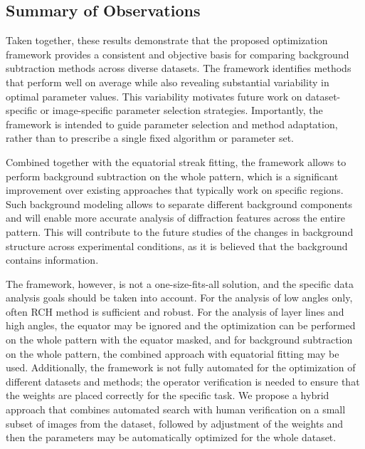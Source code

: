 \documentclass[iucr]{iucrjournals}
\begin{document}
\subsection{Summary of Observations}

Taken together, these results demonstrate that the proposed optimization framework provides a consistent and objective basis for comparing background subtraction methods across diverse datasets. The framework identifies methods that perform well on average while also revealing substantial variability in optimal parameter values. This variability motivates future work on dataset-specific or image-specific parameter selection strategies. Importantly, the framework is intended to guide parameter selection and method adaptation, rather than to prescribe a single fixed algorithm or parameter set. 

Combined together with the equatorial streak fitting, the framework allows to perform background subtraction on the whole pattern, which is a significant improvement over existing approaches that typically work on specific regions. Such background modeling allows to separate different background components and will enable more accurate analysis of diffraction features across the entire pattern. This will contribute to the future studies of the changes in background structure across experimental conditions, as it is believed that the background contains information. 

The framework, however, is not a one-size-fits-all solution, and the specific data analysis goals should be taken into account. For the analysis of low angles only, often RCH method is sufficient and robust. For the analysis of layer lines and high angles, the equator may be ignored and the optimization can be performed on the whole pattern with the equator masked, and for background subtraction on the whole pattern, the combined approach with equatorial fitting may be used. Additionally, the framework is not fully automated for the optimization of different datasets and methods; the operator verification is needed to ensure that the weights are placed correctly for the specific task. We propose a hybrid approach that combines automated search with human verification on a small subset of images from the dataset, followed by adjustment of the weights and then the parameters may be automatically optimized for the whole dataset.
\end{document}
